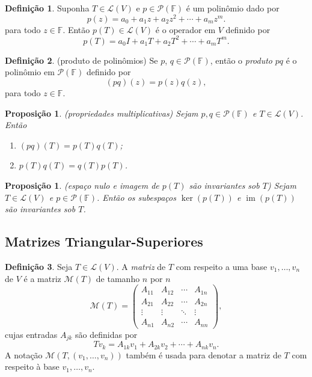 \documentclass[12pt]{article}
\theoremstyle{plain}
\newtheorem{prop}[thm]{Proposição}
\theoremstyle{definition}
\newtheorem{defn}{Definição}[section]
\theoremstyle{remark}
\DeclareMathOperator{\im}{im}
\begin{document}
\begin{defn}
    Suponha \(T \in \mathcal{L}(V)\) e \(p \in \mathcal{P}(\mathbb{F})\) é um polinômio dado por
    \[    p(z) = a_0 + a_1 z + a_2 z^2 + \cdots + a_m z^m.\]
    \noindent para todo \(z \in \mathbb{F}\). Então \(p(T) \in \mathcal{L}(V)\) é o operador em \(V\) definido por
    \[    p(T) = a_0 I + a_1 T + a_2 T^2 + \cdots + a_m T^m.\]
\end{defn}

\begin{defn} (produto de polinômios)
    Se \(p\), \(q \in \mathcal{P}(\mathbb{F})\), então o \emph{produto} \(pq\) é o polinômio em \(\mathcal{P}(\mathbb{F})\) definido por
    \[    (pq)(z) = p(z) q(z),\]
    \noindent para todo \(z \in \mathbb{F}\).
\end{defn}

\begin{prop} (propriedades multiplicativas)
    Sejam \(p, q \in \mathcal{P}(\mathbb{F})\) e \(T \in \mathcal{L}(V)\). Então
    \begin{enumerate}
        \item[(a)] \((pq)(T) = p(T) q(T)\);
        \item[(b)] \(p(T) q(T) = q(T) p(T)\).
    \end{enumerate}
\end{prop}

\begin{prop} (espaço nulo e imagem de \(p(T)\) são invariantes sob \(T\))
    Sejam \(T \in \mathcal{L}(V)\) e \(p \in \mathcal{P}(\mathbb{F})\). Então os subespaços \(\ker(p(T))\) e \(\im(p(T))\) são invariantes sob \(T\).
\end{prop}

\subsection{Matrizes Triangular-Superiores}

\begin{defn}
    Seja \(T \in \mathcal{L}(V)\). A \emph{matriz} de \(T\) com respeito a uma base \(v_1, \ldots, v_n\) de \(V\) é a matriz \(\mathcal{M}(T)\) de tamanho \(n\) por \(n\)
    \[
    \mathcal{M}(T) = \begin{pmatrix}
        A_{11} & A_{12} & \cdots & A_{1n} \\
        A_{21} & A_{22} & \cdots & A_{2n} \\
        \vdots & \vdots & \ddots & \vdots \\
        A_{n1} & A_{n2} & \cdots & A_{nn}
    \end{pmatrix},
    \]
    \noindent cujas entradas \(A_{jk}\) são definidas por
    \[
        Tv_k = A_{1k} v_1 + A_{2k} v_2 + \cdots + A_{nk} v_n.
    \]
    A notação \(\mathcal{M}(T, (v_1, \ldots, v_n))\) também é usada para denotar a matriz de \(T\) com respeito à base \(v_1, \ldots, v_n\).
\end{defn}
\end{document}
